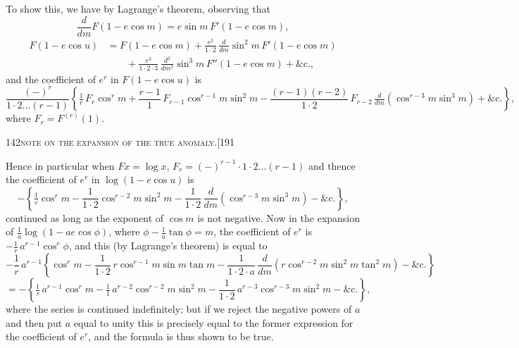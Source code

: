 \documentclass[11pt]{article}
\begin{document}
To show this, we have by Lagrange's theorem, observing that
\[
\frac{d}{dm} F(1 - e\cos m) = e\sin m\,F'(1 - e\cos m),
\]
\begin{align*}
F(1 - e\cos u) &= F(1 - e\cos m) + \frac{e^{2}}{1\cdot 2}\,\frac{d}{dm}\sin^{2} m\,F'(1 - e\cos m) \\
&\hspace{2em} + \frac{e^{3}}{1\cdot 2\cdot 3}\,\frac{d^{2}}{dm^{2}}\sin^{3} m\,F''(1 - e\cos m) + \&\text{c.,}
\end{align*}
and the coefficient of $e^{r}$ in $F(1 - e\cos u)$ is
\[
\frac{(-)^{r}}{1\cdot 2\ldots(r - 1)}\left\{\tfrac{1}{r}\,F_{r}\cos^{r} m + \frac{r-1}{1}\,F_{r-1}\cos^{r-1} m\sin^{2} m - \frac{(r-1)(r-2)}{1\cdot 2}\,F_{r-2}\,\tfrac{d}{dm}(\cos^{r-3} m\sin^{3} m) + \&\text{c.}\right\},
\]
where $F_{r} = F^{(r)}(1)$.

\newpage

\begin{center}
\small 142\hfill\textsc{note on the expansion of the true anomaly.}\hfill[191
\end{center}

\medskip

\noindent Hence in particular when $F x = \log x$, $F_{r} = (-)^{r-1}\cdot 1\cdot 2\ldots(r-1)$ and thence the coefficient of $e^{r}$ in $\log(1 - e\cos u)$ is
\[
- \left\{\tfrac{1}{r}\cos^{r} m - \frac{1}{1\cdot 2}\cos^{r-2} m\sin^{2} m - \frac{1}{1\cdot 2}\,\frac{d}{dm}(\cos^{r-3} m\sin^{3} m) - \&\text{c.}\right\},
\]
continued as long as the exponent of $\cos m$ is not negative. Now in the expansion of $\frac{1}{a}\log(1 - a e\cos\phi)$, where $\phi - \frac{1}{a}\tan\phi = m$, the coefficient of $e^{r}$ is $-\frac{1}{r}\,a^{r-1}\cos^{r}\phi$, and this (by Lagrange's theorem) is equal to
\[
- \frac{1}{r}\,a^{r-1}\left\{\cos^{r} m - \frac{1}{1\cdot 2}\,r\cos^{r-1} m\sin m\tan m - \frac{1}{1\cdot 2\cdot a}\,\frac{d}{dm}(r\cos^{r-2} m\sin^{2} m\tan^{2} m) - \&\text{c.}\right\}
\]
\[
= -\left\{\tfrac{1}{r}\,a^{r-1}\cos^{r} m - \tfrac{1}{1}\,a^{r-2}\cos^{r-2} m\sin^{2} m - \frac{1}{1\cdot 2}\,a^{r-3}\cos^{r-3} m\sin^{2} m - \&\text{c.}\right\},
\]
where the series is continued indefinitely; but if we reject the negative powers of $a$ and then put $a$ equal to unity this is precisely equal to the former expression for the coefficient of $e^{r}$, and the formula is thus shown to be true.
\end{document}
